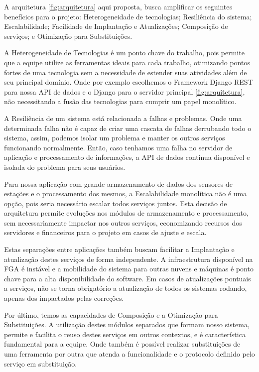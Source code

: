     A arquitetura \ref{fig:arquitetura} aqui proposta, busca amplificar os seguintes benefícios para o projeto: Heterogeneidade de tecnologias; Resiliência do sistema; Escalabilidade; Facilidade de Implantação e Atualizações; Composição de serviços; e Otimização para Substituições.

    A Heterogeneidade de Tecnologias é um ponto chave do trabalho, pois permite que a equipe utilize as ferramentas ideais para cada trabalho, otimizando pontos fortes de uma tecnologia sem a necessidade de estender suas atividades além de seu principal domínio. Onde por exemplo escolhemos o Framework Django REST para nossa API de dados e o Django para o servidor principal \ref{fig:arquitetura}, não necessitando a fusão das tecnologias para cumprir um papel monolítico.

    A Resiliência de um sistema está relacionada a falhas e problemas. Onde uma determinada falha não é capaz de criar uma cascata de falhas derrubando todo o sistema, assim, podemos isolar um problema e manter os outros serviços funcionando normalmente. Então, caso tenhamos uma falha no servidor de aplicação e processamento de informações, a API de dados continua disponível e isolada do problema para seus usuários.
    
    Para nossa aplicação com grande armazenamento de dados dos sensores de estações e o processamento dos mesmos, a Escalabilidade monolítica não é uma opção, pois seria necessário escalar todos serviços juntos. Esta decisão de arquitetura permite evoluções nos módulos de armazenamento e processamento, sem necessariamente impactar nos outros serviços, economizando recursos dos servidores e financeiros para o projeto em casos de ajuste e escala.
    
    Estas separações entre aplicações também buscam facilitar a Implantação e atualização destes serviços de forma independente. A infraestrutura disponível na FGA é instável e a mobilidade do sistema para outras nuvens e máquinas é ponto chave para a alta disponibilidade do software. Em casos de atualizações pontuais a serviços, não se torna obrigatório a atualização de todos os sistemas rodando, apenas dos impactados pelas correções.
    
    Por último, temos as capacidades de Composição e a Otimização para Substituições. A utilização destes módulos separados que formam nosso sistema, permite e facilita o reuso destes serviços em outros contextos, e é característica fundamental para a equipe. Onde também é possível realizar substituições de uma ferramenta por outra que atenda a funcionalidade e o protocolo definido pelo serviço em substituição.

